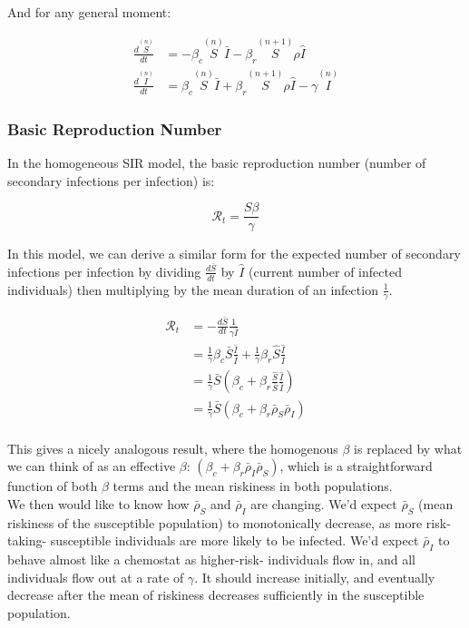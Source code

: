 \documentclass{article}
\begin{document}
{And for any general moment:


\begin{equation}
\label{eqn:moments}
\begin{aligned}
\frac{d \overset{(n)}{S} }{dt} &=
	-\beta_c \overset{(n)}{S} \bar I
	-\beta_r \overset{(n+1)}{S} \rho \hat I \\
\frac{d \overset{(n)}{I}}{dt} &=
	\beta_c \overset{(n)}{S} \bar I
	+ \beta_r \overset{(n+1)}{S} \rho \hat I - \gamma \overset{(n)}{I}
\end{aligned}
\end{equation}


\subsubsection{Basic Reproduction Number}

In the homogeneous SIR model, the basic reproduction number (number of secondary
infections per infection) is:

$$\mathcal{R}_t = \frac{S\beta}{\gamma}$$

In this model, we can derive a similar form for the expected
number of secondary infections per infection by dividing $\frac{d \bar S}{dt}$
by $\hat I$ (current number of infected individuals) then multiplying by
the mean duration of an infection $\frac{1}{\gamma}$.

\begin{align*}
\mathcal{R}_t &= -\frac{d\bar S}{dt} \frac{1}{\gamma \bar I} \\
	&= \frac{1}{\gamma} \beta_c \bar S \frac{\bar I}{\bar I}
		+ \frac{1}{\gamma} \beta_r \hat S \frac{\hat I}{\bar I}\\
	&= \frac{1}{\gamma} \bar S\left( \beta_c
		+ \beta_r \frac{\hat S}{\bar S} \frac{\hat I}{\bar I} \right)\\
	&= \frac{1}{\gamma} \bar S\left( \beta_c
		+ \beta_r \bar \rho_S \bar \rho_I \right)\\
\end{align*}

This gives a nicely analogous result, where the homogenous $\beta$ is
replaced by what we can think of as an effective $\beta$:
$(\beta_c + \beta_r \bar \rho_I \bar\rho_S)$, which is a straightforward
function of both $\beta$ terms and the mean riskiness in both populations.\\

We then would like to know how $\bar\rho_S$ and $\bar\rho_I$ are changing.
We'd expect $\bar\rho_S$ (mean riskiness of the susceptible population) to
monotonically decrease, as more risk-taking- susceptible individuals are
more likely to be infected. We'd expect $\bar\rho_I$ to behave almost
like a chemostat as higher-risk- individuals flow in, and all individuals flow
out at a rate of $\gamma$. It should increase initially, and eventually decrease
after the mean of riskiness decreases sufficiently in the susceptible population.

}
\end{document}

